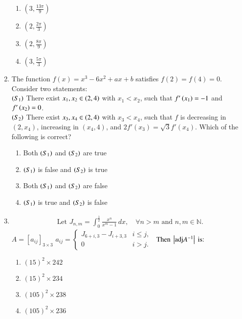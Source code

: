 \documentclass[journal,12pt,onecolumn]{IEEEtran}
\theoremstyle{remark}
\begin{document}
\begin{enumerate}
\begin{multicols}{4}
\begin{enumerate}
    \item $(3, \frac{13\pi}{9})$
    \item $(2, \frac{2\pi}{3})$
    \item $(2, \frac{8\pi}{9})$
    \item $(3, \frac{5\pi}{3})$
\end{enumerate}
\end{multicols}
\item The function $f(x) = x^3 - 6x^2 + ax + b$ satisfies $f(2) = f(4) = 0$. Consider two statements:\\[10pt]
$\left(S_1\right)$ There exist $x_1, x_2 \in \left(2, 4\right)$ with $x_1 < x_2$, such that $f'\left(x_1\right) = -1$ and $f'\left(x_2\right) = 0$.\\[10pt]
$\left(S_2\right)$ There exist $x_3, x_4 \in \left(2, 4\right)$ with $x_3 < x_4$, such that $f$ is decreasing in $(2, x_4)$, increasing in $(x_4, 4)$, and $2f'(x_3) = \sqrt{3}f'(x_4)$.
Which of the following is correct?
\begin{multicols}{2}
\begin{enumerate}
    \item Both $\left(S_1\right)$ and $\left(S_2\right)$  are true
    \item $\left(S_1\right)$ is false and $\left(S_2\right)$  is true
    \item Both $\left(S_1\right)$ and $\left(S_2\right)$ are false
    \item $\left(S_1\right)$ is true and $\left(S_2\right)$ is false
\end{enumerate}
\end{multicols}

\item \begin{align*}
\text{ Let } J_{n,m} =  \int_0^\frac{1}{2} \frac{x^n}{x^m - 1} \, dx, \quad \forall n > m \text{ and } n, m \in \mathbb{N}.
\end{align*}
 $A = [a_{ij}]_{3 \times 3}$ 
$a_{ij} = 
\begin{cases}
   J_{6+i, 3} - J_{i+3, 3} & i \leq j,\\
    0 & i > j.
    \end{cases}$
$\text{ Then } \left\vert\text{adj}A^{-1}\right\vert  \text{ is:}$
    
\begin{multicols}{2}
\begin{enumerate}
    \item $(15)^2 \times 242$\\
    \item $(15)^2 \times 234$
    \item $(105)^2 \times 238$\\
    \item $(105)^2 \times 236$
\end{enumerate}
\end{multicols}


\end{enumerate}
\end{document}
